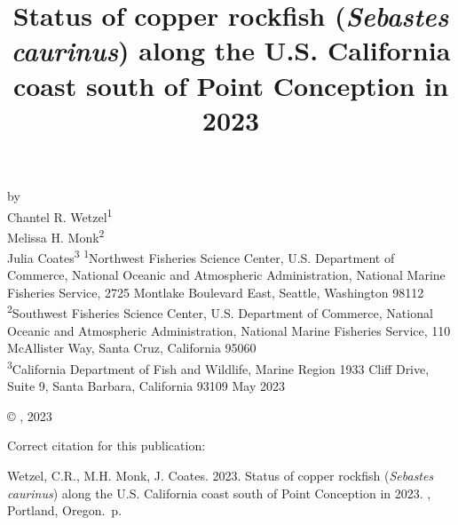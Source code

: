 \documentclass[11pt,
  english,
  letterpaper,
]{article}
\date{}
\newcommand{\trTitle}{Status of copper rockfish (\emph{Sebastes caurinus}) along the U.S. California coast south of Point Conception in 2023}
\newcommand{\trYear}{2023}
\newcommand{\trMonth}{May}
\newcommand{\trAuthsBack}{Wetzel, C.R., M.H. Monk, J. Coates}
\newcommand{\trCitation}{
\begin{hangparas}{1em}{1}
\trAuthsBack{}. \trYear{}. \trTitle{}. \glsentrylong{pfmc}, Portland, Oregon. \pageref{LastPage}{}\,p.
\end{hangparas}}
\newcommand\includegraphicsifexists[2][width=\linewidth]{\IfFileExists{#2}{\texttt{[image: \#2]}}{}}
\begin{document}

\renewcommand*{\thefootnote}{\fnsymbol{footnote}}

\small
\thispagestyle{empty}
\noindent
\begin{center}
\title{Status of copper rockfish (\emph{Sebastes caurinus}) along the U.S. California coast south of Point Conception in 2023}
\vspace{1.5cm}
{\Large\textbf{}}

\includegraphicsifexists[width=4in]{figure_title.png}
\vfill
by\\
Chantel R. Wetzel\textsuperscript{1}\\
Melissa H. Monk\textsuperscript{2}\\
Julia Coates\textsuperscript{3}\vfill
\textsuperscript{1}Northwest Fisheries Science Center, U.S. Department of Commerce, National Oceanic and Atmospheric Administration, National Marine Fisheries Service, 2725 Montlake Boulevard East, Seattle, Washington 98112\\
\textsuperscript{2}Southwest Fisheries Science Center, U.S. Department of Commerce, National Oceanic and Atmospheric Administration, National Marine Fisheries Service, 110 McAllister Way, Santa Cruz, California 95060\\
\textsuperscript{3}California Department of Fish and Wildlife, Marine Region 1933 Cliff Drive, Suite 9, Santa Barbara, California 93109\vfill
\trMonth{} \trYear{}
\end{center}
\clearpage

\thispagestyle{empty}
\vspace*{\fill}
\begin{center}
\copyright{} , \trYear{}\\
\end{center}
\par
\bigskip
\noindent
Correct citation for this publication:
\bigskip
\par
\trCitation{}
\clearpage


\tableofcontents\clearpage
\label{TRlastRoman}
\clearpage
\end{document}
